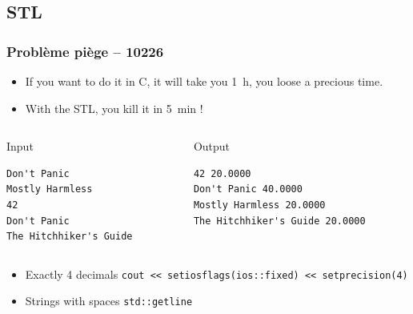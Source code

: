 \documentclass[10pt,svgnames,usenames,table]{beamer} %
\begin{document}
\subsection{STL}
\begin{frame}[fragile]
  \frametitle{Problème piège -- 10226}
  \begin{itemize}
    \item If you want to do it in C,
      it will take you \SI{1}{h}, you loose a precious time.
    \item With the STL, you kill it in \SI{5}{min} !
  \end{itemize}
  \begin{columns}
    \begin{column}{0.5\textwidth}
      \begin{block}{Input}
        \begin{verbatim}
Don't Panic
Mostly Harmless
42
Don't Panic
The Hitchhiker's Guide
        \end{verbatim}
      \end{block}
    \end{column}
    \begin{column}{0.5\textwidth}
      \begin{block}{Output}
        \begin{verbatim}
42 20.0000
Don't Panic 40.0000
Mostly Harmless 20.0000
The Hitchhiker's Guide 20.0000
        \end{verbatim}
      \end{block}
    \end{column}
  \end{columns}
  \begin{itemize}
    \item Exactly 4 decimals \lstinline|cout << setiosflags(ios::fixed) << setprecision(4)|
    \item Strings with spaces \lstinline|std::getline|
  \end{itemize}
\end{frame}
\end{document}

